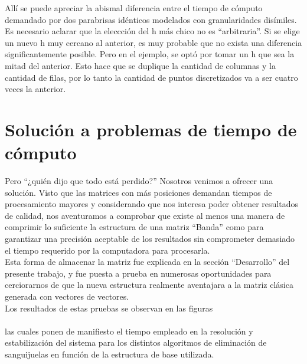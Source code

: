 \documentclass[double, 1.5in, 12pt]{beavtex}
\begin{document}
\color{red}{ BLABLABLABLA.}
 
Allí se puede apreciar la abismal diferencia entre el tiempo de cómputo demandado por dos parabrisas idénticos modelados con granularidades disímiles. \\
Es necesario aclarar que la eleccci\'on del h m\'as chico no es “arbitraria”. Si se elige un nuevo h muy cercano al anterior, es muy probable que no exista una diferencia significantemente posible. Pero en el ejemplo, se opt\'o por tomar un h que sea la mitad del anterior. Esto hace que se duplique la cantidad de columnas y la cantidad de filas, por lo tanto la cantidad de puntos discretizados va a ser cuatro veces la anterior.


\section{Soluci\'on a problemas de tiempo de c\'omputo}
Pero “¿qui\'en dijo que todo est\'a perdido?” Nosotros venimos a ofrecer una soluci\'on. Visto que las matrices con m\'as posiciones demandan tiempos de procesamiento mayores y considerando que nos interesa poder obtener resultados de calidad, nos aventuramos a comprobar que existe al menos una manera de comprimir lo suficiente la estructura de una matriz  “Banda” como para garantizar una precisi\'on aceptable de los resultados sin comprometer demasiado el tiempo requerido por la computadora para procesarla. \\
Esta forma de almacenar la matriz fue explicada en la secci\'on “Desarrollo” del presente trabajo, y fue puesta a prueba en numerosas oportunidades para cerciorarnos de que la nueva estructura realmente aventajara a la matriz cl\'asica generada con vectores de vectores. \\
Los resultados de estas pruebas se observan en las figuras \\
\color{red}{
BLA Y BLA (x ej el de matriz vacia y las q puedan usarse para comparar TIEMPO en funcion de BANDA/COMUN aplicando o sin aplicar algoritmos) }\\

 las cuales ponen de manifiesto el tiempo empleado en la resoluci\'on y estabilizaci\'on del sistema para los distintos algoritmos de eliminaci\'on de sanguijuelas en funci\'on de la estructura de base utilizada. \\
\end{document}
